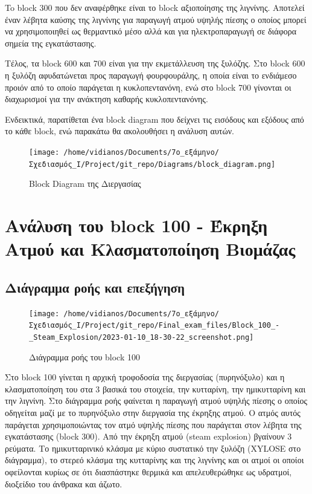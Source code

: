 \documentclass[11pt]{article}
\begin{document}
To block 300 που δεν αναφέρθηκε είναι το block αξιοποίησης της λιγνίνης. Αποτελεί έναν λέβητα καύσης της λιγνίνης για παραγωγή ατμού υψηλής πίεσης ο οποίος μπορεί να χρησιμοποιηθεί ως θερμαντικό μέσο αλλά και για ηλεκτροπαραγωγή σε διάφορα σημεία της εγκατάστασης.

Τέλος, τα block 600 και 700 είναι για την εκμετάλλευση της ξυλόζης. Στο block 600 η ξυλόζη αφυδατώνεται προς παραγωγή φουρφουράλης, η οποία είναι το ενδιάμεσο προιόν από το οποίο παράγεται η κυκλοπεντανόνη, ενώ στο block 700 γίνονται οι διαχωρισμοί για την ανάκτηση καθαρής κυκλοπεντανόνης.

Ενδεικτικά, παρατίθεται ένα block diagram που δείχνει τις εισόδους και εξόδους από το κάθε block, ενώ παρακάτω θα ακολουθήσει η ανάλυση αυτών.

\begin{figure}[htbp]
\centering
\texttt{[image: /home/vidianos/Documents/7o\_εξάμηνο/Σχεδιασμός\_Ι/Project/git\_repo/Diagrams/block\_diagram.png]}
\caption{Block Diagram της Διεργασίας}
\end{figure}

\section{Ανάλυση του block 100 - Έκρηξη Ατμού και Κλασματοποίηση Βιομάζας}
\label{sec:org775d14b}

\subsection{Διάγραμμα ροής και επεξήγηση}
\label{sec:orgc4fc6cf}
\begin{figure}[htbp]
\centering
\texttt{[image: /home/vidianos/Documents/7o\_εξάμηνο/Σχεδιασμός\_Ι/Project/git\_repo/Final\_exam\_files/Block\_100\_-\_Steam\_Explosion/2023-01-10\_18-30-22\_screenshot.png]}
\caption{Διάγραμμα ροής του block 100}
\end{figure}

Στο block 100 γίνεται η αρχική τροφοδοσία της διεργασίας (πυρηνόξυλο) και η κλασματοποίηση του στα 3 βασικά του στοιχεία, την κυτταρίνη, την ημικυτταρίνη και την λιγνίνη. Στο διάγραμμα ροής φαίνεται η παραγωγή ατμού υψηλής πίεσης ο οποίος οδηγείται μαζί με το πυρηνόξυλο στην διεργασία της έκρηξης ατμού. Ο ατμός αυτός παράγεται χρησιμοποιώντας τον ατμό υψηλής πίεσης που παράγεται στον λέβητα της εγκατάστασης (block 300). Από την έκρηξη ατμού (steam explosion) βγαίνουν 3 ρεύματα. Το ημικυτταρινικό κλάσμα με κύριο συστατικό την ξυλόζη (XYLOSE στο διάγραμμα), το στερεό κλάσμα της κυτταρίνης και της λιγνίνης και οι ατμοί οι οποίοι οφείλονται κυρίως σε ότι διασπάστηκε θερμικά και απελευθερώθηκε ως υδρατμοί, διοξείδιο του άνθρακα και άζωτο.
\end{document}
